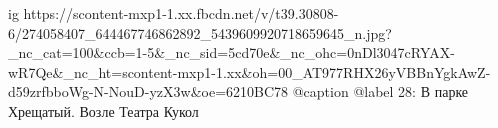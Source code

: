  
 
 
 
 

\ifcmt
  ig https://scontent-mxp1-1.xx.fbcdn.net/v/t39.30808-6/274058407_644467746862892_5439609920718659645_n.jpg?_nc_cat=100&ccb=1-5&_nc_sid=5cd70e&_nc_ohc=0nDl3047cRYAX-wR7Qe&_nc_ht=scontent-mxp1-1.xx&oh=00_AT977RHX26yVBBnYgkAwZ-d59zrfbboWg-N-NouD-yzX3w&oe=6210BC78
  @caption @label 28: В парке Хрещатый. Возле Театра Кукол
\fi
